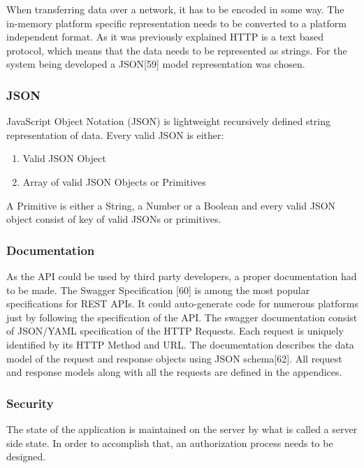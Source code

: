 \documentclass{article}
\begin{document}
When transferring data over a network, it has to be encoded in some way. The in-memory platform specific representation needs to be converted to a platform independent format. As it was previously explained HTTP is a text based protocol, which means that the data needs to be represented as strings. For the system being developed a JSON[59] model representation was chosen.

\subsubsection{JSON}
JavaScript Object Notation (JSON) is lightweight recursively defined string representation of data.
Every valid JSON is either:
\begin{enumerate}
\item Valid JSON Object
\item Array of valid JSON Objects or Primitives
\end{enumerate}
A Primitive is either a String, a Number or a Boolean and every valid JSON object consist of key of valid JSONs or primitives.

\subsubsection{Documentation}
As the API could be used by third party developers, a proper documentation had to be made. The Swagger Specification [60] is among the most popular specifications for REST APIs. It could auto-generate code for numerous platforms just by following the specification of the API. The swagger documentation consist of JSON/YAML specification of the HTTP Requests. Each request is uniquely identified by its HTTP Method and URL. The documentation describes the data model of the request and response objects using JSON schema[62]. All request and response models along with all the requests are defined in the appendices.

\subsubsection{Security}
The state of the application is maintained on the server by what is called a server side state. In order to accomplish that, an authorization process needs to be designed. 
\end{document}
